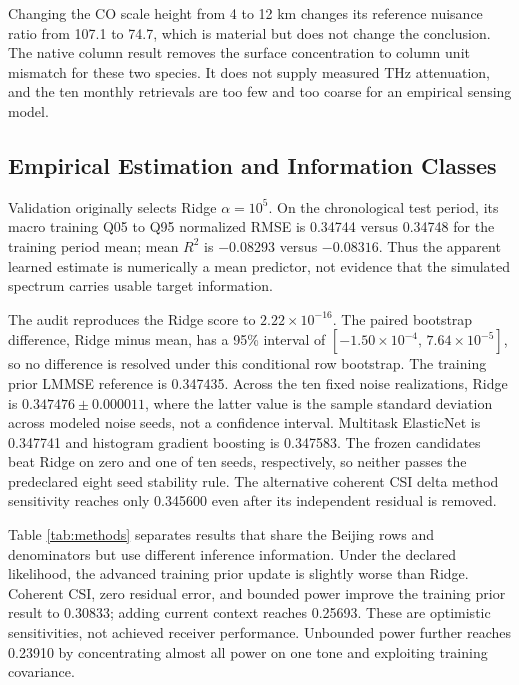 \documentclass[conference]{IEEEtran}
\begin{document}
Changing the CO scale height from 4 to 12 km changes its reference nuisance ratio from 107.1 to 74.7, which is material but does not change the conclusion. The native column result removes the surface concentration to column unit mismatch for these two species. It does not supply measured THz attenuation, and the ten monthly retrievals are too few and too coarse for an empirical sensing model.

\subsection{Empirical Estimation and Information Classes}

Validation originally selects Ridge $\alpha=10^5$. On the chronological test period, its macro training Q05 to Q95 normalized RMSE is 0.34744 versus 0.34748 for the training period mean; mean $R^2$ is $-0.08293$ versus $-0.08316$. Thus the apparent learned estimate is numerically a mean predictor, not evidence that the simulated spectrum carries usable target information.

The audit reproduces the Ridge score to $2.22\times10^{-16}$. The paired bootstrap difference, Ridge minus mean, has a 95\% interval of $[-1.50\times10^{-4},\,7.64\times10^{-5}]$, so no difference is resolved under this conditional row bootstrap. The training prior LMMSE reference is 0.347435. Across the ten fixed noise realizations, Ridge is $0.347476\pm0.000011$, where the latter value is the sample standard deviation across modeled noise seeds, not a confidence interval. Multitask ElasticNet is 0.347741 and histogram gradient boosting is 0.347583. The frozen candidates beat Ridge on zero and one of ten seeds, respectively, so neither passes the predeclared eight seed stability rule. The alternative coherent CSI delta method sensitivity reaches only 0.345600 even after its independent residual is removed.

Table \ref{tab:methods} separates results that share the Beijing rows and denominators but use different inference information. Under the declared likelihood, the advanced training prior update is slightly worse than Ridge. Coherent CSI, zero residual error, and bounded power improve the training prior result to 0.30833; adding current context reaches 0.25693. These are optimistic sensitivities, not achieved receiver performance. Unbounded power further reaches 0.23910 by concentrating almost all power on one tone and exploiting training covariance.
\end{document}
